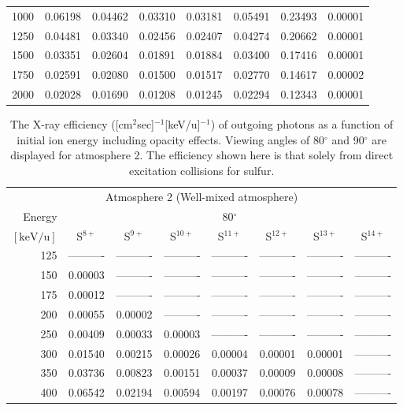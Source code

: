 \begin{table}[ht]
\begin{tabular}{r|c|c|c|c|c|c|c}
     1000 & 0.06198 & 0.04462 & 0.03310 & 0.03181 & 0.05491 & 0.23493 & 0.00001 \\
     1250 & 0.04481 & 0.03340 & 0.02456 & 0.02407 & 0.04274 & 0.20662 & 0.00001 \\
     1500 & 0.03351 & 0.02604 & 0.01891 & 0.01884 & 0.03400 & 0.17416 & 0.00001 \\
     1750 & 0.02591 & 0.02080 & 0.01500 & 0.01517 & 0.02770 & 0.14617 & 0.00002 \\
     2000 & 0.02028 & 0.01690 & 0.01208 & 0.01245 & 0.02294 & 0.12343 & 0.00001 \\ \cline{1-8}
    \end{tabular}
    \label{tab:XRayEffODE3}
\end{table}

\begin{table}[ht]
    \centering
    \caption{The X-ray efficiency ([cm$^2$sec]$^{-1}$[keV/u]$^{-1}$) of outgoing photons as a function of initial ion energy including opacity effects. Viewing angles of 80$^\circ$ and 90$^\circ$ are displayed for atmosphere 2. The efficiency shown here is that solely from direct excitation collisions for sulfur.}
    \begin{tabular}{r|c|c|c|c|c|c|c}
    \multicolumn{8}{c}{Atmosphere 2 (Well-mixed atmosphere)} \\ \cline{2-8}
    Energy & \multicolumn{7}{c}{80$^\circ$} \\ \cline{2-8}
    $\mathrm{[keV/u]}$ & S$^{8+}$ & S$^{9+}$ & S$^{10+}$ & S$^{11+}$ & S$^{12+}$ & S$^{13+}$ & S$^{14+}$ \\ \cline{1-8}
      125 & ---------- & ---------- & ---------- & ---------- & ---------- & ---------- & ---------- \\
      150 & 0.00003 & ---------- & ---------- & ---------- & ---------- & ---------- & ---------- \\
      175 & 0.00012 & ---------- & ---------- & ---------- & ---------- & ---------- & ---------- \\
      200 & 0.00055 & 0.00002 & ---------- & ---------- & ---------- & ---------- & ---------- \\
      250 & 0.00409 & 0.00033 & 0.00003 & ---------- & ---------- & ---------- & ---------- \\
      300 & 0.01540 & 0.00215 & 0.00026 & 0.00004 & 0.00001 & 0.00001 & ---------- \\
      350 & 0.03736 & 0.00823 & 0.00151 & 0.00037 & 0.00009 & 0.00008 & ---------- \\
      400 & 0.06542 & 0.02194 & 0.00594 & 0.00197 & 0.00076 & 0.00078 & ---------- \\

\end{tabular}
\end{table}
